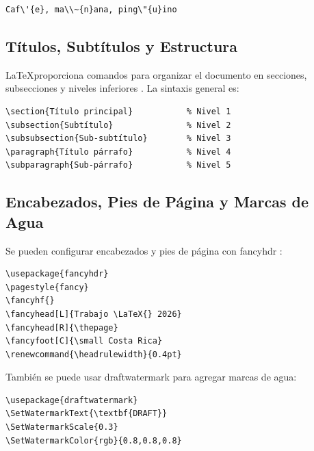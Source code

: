 \begin{verbatim}
Caf\'{e}, ma\\~{n}ana, ping\"{u}ino
\end{verbatim}

\subsection{Títulos, Subtítulos y Estructura}

\LaTeX proporciona comandos para organizar el documento en secciones, subsecciones y niveles inferiores \cite{latex_project}. La sintaxis general es:

\begin{verbatim}
\section{Título principal}           % Nivel 1
\subsection{Subtítulo}               % Nivel 2
\subsubsection{Sub-subtítulo}        % Nivel 3
\paragraph{Título párrafo}           % Nivel 4
\subparagraph{Sub-párrafo}           % Nivel 5
\end{verbatim}

\subsection{Encabezados, Pies de Página y Marcas de Agua}

Se pueden configurar encabezados y pies de página con fancyhdr \cite{fancyhdr}:

\begin{verbatim}
\usepackage{fancyhdr}
\pagestyle{fancy}
\fancyhf{}
\fancyhead[L]{Trabajo \LaTeX{} 2026} 
\fancyhead[R]{\thepage} 
\fancyfoot[C]{\small Costa Rica}
\renewcommand{\headrulewidth}{0.4pt}
\end{verbatim}

También se puede usar draftwatermark \cite{draftwatermark} para agregar marcas de agua:

\begin{verbatim}
\usepackage{draftwatermark}
\SetWatermarkText{\textbf{DRAFT}}
\SetWatermarkScale{0.3}
\SetWatermarkColor{rgb}{0.8,0.8,0.8}
\end{verbatim}

